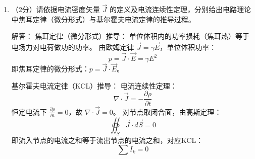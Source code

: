 \begin{enumerate}
\item （2分）请依据电流密度矢量 $\vec{J}$ 的定义及电流连续性定理，分别给出电路理论中焦耳定律（微分形式）与基尔霍夫电流定律的推导过程。

解答：
焦耳定律（微分形式）推导：
单位体积内的功率损耗（焦耳热）等于电场力对电荷做功的功率。
由欧姆定律 $\vec{J}=\gamma\vec{E}$，单位体积功率：
\[
p = \vec{J}\cdot\vec{E} = \gamma E^2
\]
即焦耳定律的微分形式：$p=\vec{J}\cdot\vec{E}$。

基尔霍夫电流定律（KCL）推导：
电流连续性定理：
\[
\nabla\cdot\vec{J} = -\frac{\partial\rho}{\partial t}
\]
恒定电流下 $\frac{\partial\rho}{\partial t}=0$，故 $\nabla\cdot\vec{J}=0$。
对节点取闭合面，由高斯定理：
\[
\oiint_S \vec{J}\cdot d\vec{S} = 0
\]
即流入节点的电流之和等于流出节点的电流之和，对应KCL：
\[
\sum I_k = 0
\]

\end{enumerate}